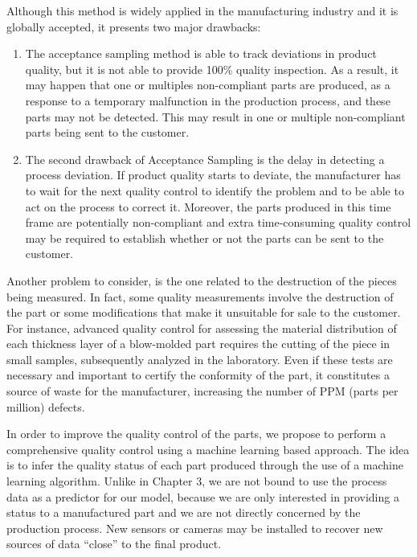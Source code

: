 Although this method is widely applied in the manufacturing industry and it is globally accepted, it presents two major drawbacks:
\begin{enumerate}
    \item The acceptance sampling method is able to track deviations in product quality, but it is not able to provide 100\% quality inspection. As a result, it may happen that one or multiples non-compliant parts are produced, as a response to a temporary malfunction in the production process, and these parts may not be detected. This may result in one or multiple non-compliant parts being sent to the customer.
    \item The second drawback of Acceptance Sampling is the delay in detecting a process deviation. If product quality starts to deviate, the manufacturer has to wait for the next quality control to identify the problem and to be able to act on the process to correct it. Moreover, the parts produced in this time frame are potentially non-compliant and extra time-consuming quality control may be required to establish whether or not the parts can be sent to the customer.
\end{enumerate}

Another problem to consider, is the one related to the destruction of the pieces being measured. In fact, some quality measurements involve the destruction of the part or some modifications that make it unsuitable for sale to the customer. For instance, advanced quality control for assessing the material distribution of each thickness layer of a blow-molded part requires the cutting of the piece in small samples, subsequently analyzed in the laboratory. Even if these tests are necessary and important to certify the conformity of the part, it constitutes a source of waste for the manufacturer, increasing the number of PPM (parts per million) defects. 

In order to improve the quality control of the parts, we propose to perform a comprehensive quality control using a machine learning based approach. The idea is to infer the quality status of each part produced through the use of a machine learning algorithm. Unlike in Chapter 3, we are not bound to use the process data as a predictor for our model, because we are only interested in providing a status to a manufactured part and we are not directly concerned by the production process. New sensors or cameras may be installed to recover new sources of data ``close'' to the final product.

